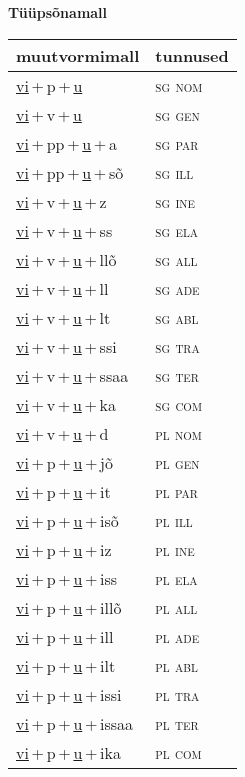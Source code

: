 
\vspace{1.8em}
\begin{minipage}{\textwidth}
\textbf{Tüüpsõnamall \,}\\

\begin{sideways}
\begin{tabular}{l l}
muutvormimall & tunnused \\
\hline
\underline{vi}\,+\,p\,+\,\underline{u} & \textsc{ sg nom } \\
\underline{vi}\,+\,v\,+\,\underline{u} & \textsc{ sg gen } \\
\underline{vi}\,+\,pp\,+\,\underline{u}\,+\,a & \textsc{ sg par } \\
\underline{vi}\,+\,pp\,+\,\underline{u}\,+\,sõ & \textsc{ sg ill } \\
\underline{vi}\,+\,v\,+\,\underline{u}\,+\,z & \textsc{ sg ine } \\
\underline{vi}\,+\,v\,+\,\underline{u}\,+\,ss & \textsc{ sg ela } \\
\underline{vi}\,+\,v\,+\,\underline{u}\,+\,llõ & \textsc{ sg all } \\
\underline{vi}\,+\,v\,+\,\underline{u}\,+\,ll & \textsc{ sg ade } \\
\underline{vi}\,+\,v\,+\,\underline{u}\,+\,lt & \textsc{ sg abl } \\
\underline{vi}\,+\,v\,+\,\underline{u}\,+\,ssi & \textsc{ sg tra } \\
\underline{vi}\,+\,v\,+\,\underline{u}\,+\,ssaa & \textsc{ sg ter } \\
\underline{vi}\,+\,v\,+\,\underline{u}\,+\,ka & \textsc{ sg com } \\
\underline{vi}\,+\,v\,+\,\underline{u}\,+\,d & \textsc{ pl nom } \\
\underline{vi}\,+\,p\,+\,\underline{u}\,+\,jõ & \textsc{ pl gen } \\
\underline{vi}\,+\,p\,+\,\underline{u}\,+\,it & \textsc{ pl par } \\
\underline{vi}\,+\,p\,+\,\underline{u}\,+\,isõ & \textsc{ pl ill } \\
\underline{vi}\,+\,p\,+\,\underline{u}\,+\,iz & \textsc{ pl ine } \\
\underline{vi}\,+\,p\,+\,\underline{u}\,+\,iss & \textsc{ pl ela } \\
\underline{vi}\,+\,p\,+\,\underline{u}\,+\,illõ & \textsc{ pl all } \\
\underline{vi}\,+\,p\,+\,\underline{u}\,+\,ill & \textsc{ pl ade } \\
\underline{vi}\,+\,p\,+\,\underline{u}\,+\,ilt & \textsc{ pl abl } \\
\underline{vi}\,+\,p\,+\,\underline{u}\,+\,issi & \textsc{ pl tra } \\
\underline{vi}\,+\,p\,+\,\underline{u}\,+\,issaa & \textsc{ pl ter } \\
\underline{vi}\,+\,p\,+\,\underline{u}\,+\,ika & \textsc{ pl com } \\
\end{tabular}
\end{sideways}
\label{tab:tüüpsõnamall-vipu}


\end{minipage}
